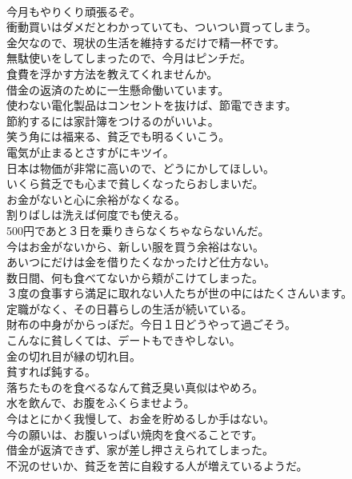 \documentclass[8pt]{extreport}
\begin{document}
\begin{CJK}{UTF8}{min}
\\	今月もやりくり頑張るぞ。	
\\	衝動買いはダメだとわかっていても、ついつい買ってしまう。	
\\	金欠なので、現状の生活を維持するだけで精一杯です。	
\\	無駄使いをしてしまったので、今月はピンチだ。	
\\	食費を浮かす方法を教えてくれませんか。	
\\	借金の返済のために一生懸命働いています。	
\\	使わない電化製品はコンセントを抜けば、節電できます。	
\\	節約するには家計簿をつけるのがいいよ。	
\\	笑う角には福来る、貧乏でも明るくいこう。	
\\	電気が止まるとさすがにキツイ。	
\\	日本は物価が非常に高いので、どうにかしてほしい。	
\\	いくら貧乏でも心まで貧しくなったらおしまいだ。	
\\	お金がないと心に余裕がなくなる。	
\\	割りばしは洗えば何度でも使える。	
\\	500円であと３日を乗りきらなくちゃならないんだ。	
\\	今はお金がないから、新しい服を買う余裕はない。	
\\	あいつにだけは金を借りたくなかったけど仕方ない。	
\\	数日間、何も食べてないから頬がこけてしまった。	
\\	３度の食事すら満足に取れない人たちが世の中にはたくさんいます。	
\\	定職がなく、その日暮らしの生活が続いている。	
\\	財布の中身がからっぽだ。今日１日どうやって過ごそう。	
\\	こんなに貧しくては、デートもできやしない。	
\\	金の切れ目が縁の切れ目。	
\\	貧すれば鈍する。	
\\	落ちたものを食べるなんて貧乏臭い真似はやめろ。	
\\	水を飲んで、お腹をふくらませよう。	
\\	今はとにかく我慢して、お金を貯めるしか手はない。	
\\	今の願いは、お腹いっぱい焼肉を食べることです。	
\\	借金が返済できず、家が差し押さえられてしまった。	
\\	不況のせいか、貧乏を苦に自殺する人が増えているようだ。	

\end{CJK}
\end{document}
